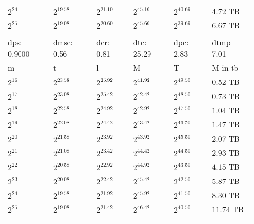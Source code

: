 \begin{tabular}{llllll}
$2^{24}$ & $2^{19.58}$ & $2^{21.10}$ & $2^{45.10}$ & $2^{40.69}$ & $4.72$ TB \\
$2^{25}$ & $2^{19.08}$ & $2^{20.60}$ & $2^{45.60}$ & $2^{39.69}$ & $6.67$ TB \\
 &  &  &  &  &  \\
dps: 0.9000 & dmsc: 0.56 & dcr: 0.81 & dtc: 25.29 & dpc: 2.83 & dtmp 7.01 \\
m & t & l & M & T & M in tb \\
$2^{16}$ & $2^{23.58}$ & $2^{25.92}$ & $2^{41.92}$ & $2^{49.50}$ & $0.52$ TB \\
$2^{17}$ & $2^{23.08}$ & $2^{25.42}$ & $2^{42.42}$ & $2^{48.50}$ & $0.73$ TB \\
$2^{18}$ & $2^{22.58}$ & $2^{24.92}$ & $2^{42.92}$ & $2^{47.50}$ & $1.04$ TB \\
$2^{19}$ & $2^{22.08}$ & $2^{24.42}$ & $2^{43.42}$ & $2^{46.50}$ & $1.47$ TB \\
$2^{20}$ & $2^{21.58}$ & $2^{23.92}$ & $2^{43.92}$ & $2^{45.50}$ & $2.07$ TB \\
$2^{21}$ & $2^{21.08}$ & $2^{23.42}$ & $2^{44.42}$ & $2^{44.50}$ & $2.93$ TB \\
$2^{22}$ & $2^{20.58}$ & $2^{22.92}$ & $2^{44.92}$ & $2^{43.50}$ & $4.15$ TB \\
$2^{23}$ & $2^{20.08}$ & $2^{22.42}$ & $2^{45.42}$ & $2^{42.50}$ & $5.87$ TB \\
$2^{24}$ & $2^{19.58}$ & $2^{21.92}$ & $2^{45.92}$ & $2^{41.50}$ & $8.30$ TB \\
$2^{25}$ & $2^{19.08}$ & $2^{21.42}$ & $2^{46.42}$ & $2^{40.50}$ & $11.74$ TB \\
 &  &  &  &  &  \\
\end{tabular}